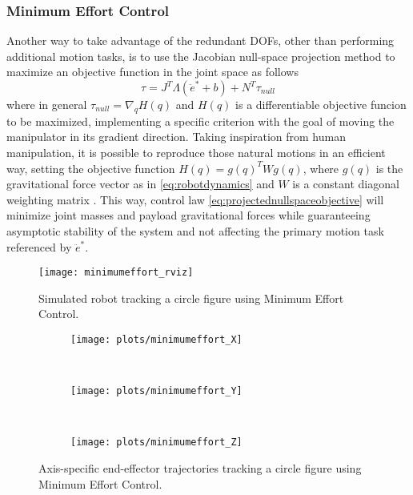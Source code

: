 \subsubsection{Minimum Effort Control}
Another way to take advantage of the redundant DOFs, other than performing additional motion tasks, is to use the Jacobian null-space projection method to maximize an objective function in the joint space as follows
\begin{equation}
\tau = J^T\Lambda(\ddot{e}^* + b) + N^T\tau_{null}
\label{eq:projectednullspaceobjective}
\end{equation}
where in general $\tau_{null} = \nabla_{q}H(q)$ and $H(q)$ is a differentiable objective funcion to be maximized, implementing a specific criterion with the goal of moving the manipulator in its gradient direction. Taking inspiration from human manipulation, it is possible to reproduce those natural motions in an efficient way, setting the objective function $H(q) = g(q)^{T}Wg(q)$, where $g(q)$ is the gravitational force vector as in \eqref{eq:robotdynamics} and $W$ is a constant diagonal weighting matrix \cite{ajoudani13}. This way, control law \eqref{eq:projectednullspaceobjective} will minimize joint masses and payload gravitational forces while guaranteeing asymptotic stability of the system and not affecting the primary motion task referenced by $\ddot{e}^*$.

\begin{figure}[H]
\centering
\texttt{[image: minimumeffort\_rviz]}
\caption{Simulated robot tracking a circle figure using Minimum Effort Control.}
\end{figure}
\begin{figure}[H]
	\centering
	\begin{subfigure}[t]{\textwidth}
		\texttt{[image: plots/minimumeffort\_X]}
	\end{subfigure}
	\\
	\begin{subfigure}[t]{\textwidth}
		\texttt{[image: plots/minimumeffort\_Y]}
	\end{subfigure}
	\\
	\begin{subfigure}[t]{\textwidth}
		\texttt{[image: plots/minimumeffort\_Z]}
	\end{subfigure}
	\caption{Axis-specific end-effector trajectories tracking a circle figure using Minimum Effort Control.}
\end{figure}

